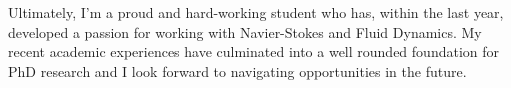 \documentclass{article}
\begin{document}


Ultimately, I'm a proud and hard-working student who has, within the last year, developed a passion for working with Navier-Stokes and Fluid Dynamics. My recent academic experiences have culminated into a well rounded foundation for PhD research and I look forward to navigating opportunities in the future. 

\end{document}
